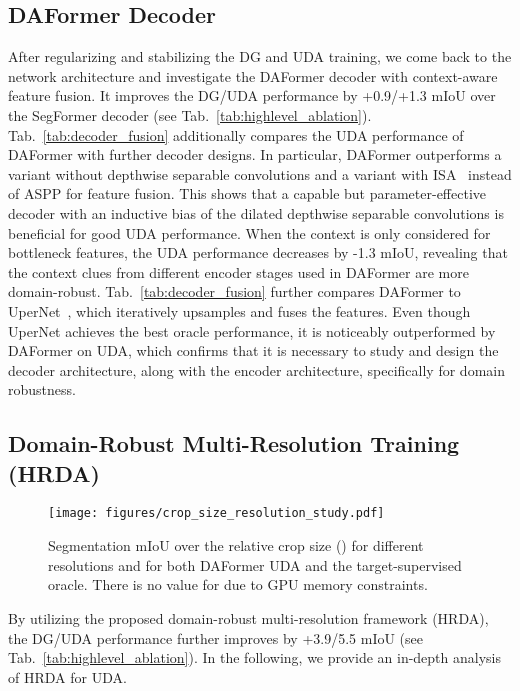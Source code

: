 \documentclass[journal,compsoc]{IEEEtran}
\begin{document}
\subsection{DAFormer Decoder}
\label{sec:exp_context_aware_fusion}

After regularizing and stabilizing the DG and UDA training, we come back to the network architecture and investigate the DAFormer decoder with context-aware feature fusion. 
It improves the DG/UDA performance by +0.9/+1.3 mIoU over the SegFormer decoder (see Tab.~\ref{tab:highlevel_ablation}). Tab.~\ref{tab:decoder_fusion} additionally compares the UDA performance of DAFormer with further decoder designs. In particular, DAFormer outperforms a variant without depthwise separable convolutions and a variant with ISA~\cite{huang2019interlaced} instead of ASPP for feature fusion. This shows that a capable but parameter-effective decoder with an inductive bias of the dilated depthwise separable convolutions is beneficial for good UDA performance.
When the context is only considered for bottleneck features, the UDA performance decreases by -1.3 mIoU, revealing that the context clues from different encoder stages used in DAFormer are more domain-robust.
Tab.~\ref{tab:decoder_fusion} further compares DAFormer to UperNet~\cite{xiao2018unified}, which iteratively upsamples and fuses the features. Even though UperNet achieves the best oracle performance, it is noticeably outperformed by DAFormer on UDA, which confirms that it is necessary to study and design the decoder architecture, along with the encoder architecture, specifically for domain robustness.


\subsection{Domain-Robust Multi-Resolution Training (HRDA)}
\label{sec:exp_resolution_crop_size}
\label{sec:exp_multi_resolution_uda}

\begin{figure}
\centering
\texttt{[image: figures/crop\_size\_resolution\_study.pdf]}
\caption{Segmentation mIoU over the relative crop size () for different resolutions and for both DAFormer UDA and the target-supervised oracle. There is no value for  due to GPU memory constraints.}
\label{fig:crop_resolution}
\end{figure}

By utilizing the proposed domain-robust multi-resolution framework (HRDA), the DG/UDA performance further improves by +3.9/5.5 mIoU (see Tab.~\ref{tab:highlevel_ablation}). In the following, we provide an in-depth analysis of HRDA for UDA.
\end{document}
